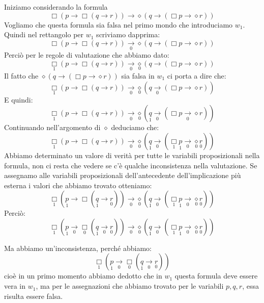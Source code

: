 \documentclass[a4paper, 12pt]{article}
\begin{document}
Iniziamo considerando la formula
$$\Box(p \rightarrow \Box(q \rightarrow r)) \rightarrow \diamond(q \rightarrow (\Box p \rightarrow \diamond r))$$
Vogliamo che questa formula sia falsa nel primo mondo che introduciamo $w_1$.
Quindi nel rettangolo per $w_1$ scriviamo dapprima:
$$\Box(p \rightarrow \Box(q \rightarrow r)) \underset{0}{\rightarrow} \diamond(q \rightarrow (\Box p \rightarrow \diamond r))$$
Perciò per le regole di valutazione che abbiamo dato:
$$\underset{1}{\Box}(p \rightarrow \Box(q \rightarrow r)) \underset{0}{\rightarrow} \underset{0}\diamond(q \rightarrow (\Box p \rightarrow \diamond r))$$
Il fatto che $\diamond(q \rightarrow (\Box p \rightarrow \diamond r))$ sia falsa in $w_1$ ci porta a dire che:
$$\underset{1}{\Box}(p \rightarrow \Box(q \rightarrow r)) \underset{0}{\rightarrow} \underset{0}\diamond(q \underset{0}{\rightarrow} (\Box p \rightarrow \diamond r))$$
E quindi:
$$\underset{1}{\Box}(p \rightarrow \Box(q \rightarrow r)) \underset{0}{\rightarrow} \underset{0}\diamond(\underset{1}{q} \underset{0}{\rightarrow} (\Box p \underset{0}{\rightarrow} \diamond r))$$
Continuando nell'argomento di $\diamond$ deduciamo che:
$$\underset{1}{\Box}(p \rightarrow \Box(q \rightarrow r)) \underset{0}{\rightarrow} \underset{0}\diamond(\underset{1}{q} \underset{0}{\rightarrow} (\underset{1}{\Box} \underset{1}{p} \underset{0}{\rightarrow} \underset{0}{\diamond} \underset{0}{r}))$$
Abbiamo determinato un valore di verità per tutte le variabili proposizionali nella formula, non ci resta che vedere se c'è qualche inconsistenza nella valutazione.
Se assegnamo alle variabili proposizionali dell'antecedente dell'implicazione più esterna i valori
che abbiamo trovato otteniamo:
$$\underset{1}{\Box}(\underset{1}{p} \rightarrow \Box(\underset{1}{q} \rightarrow \underset{0}{r})) \underset{0}{\rightarrow} \underset{0}\diamond(\underset{1}{q} \underset{0}{\rightarrow} (\underset{1}{\Box} \underset{1}{p} \underset{0}{\rightarrow} \underset{0}{\diamond} \underset{0}{r}))$$
Perciò:
$$\underset{1}{\Box}(\underset{1}{p} \underset{0}{\rightarrow} \underset{0}{\Box}(\underset{1}{q} \underset{0}{\rightarrow} \underset{0}{r})) \underset{0}{\rightarrow} \underset{0}\diamond(\underset{1}{q} \underset{0}{\rightarrow} (\underset{1}{\Box} \underset{1}{p} \underset{0}{\rightarrow} \underset{0}{\diamond} \underset{0}{r}))$$

Ma abbiamo un'inconsistenza, perché abbiamo:
$$\underset{1}{\Box}(\underset{1}{p} \underset{0}{\rightarrow}\underset{0}{\Box}(\underset{1}{q} \underset{0}{\rightarrow} \underset{0}{r}))$$
cioè in un primo momento abbiamo dedotto che in $w_1$ questa formula deve essere vera in $w_1$,
ma per le assegnazioni che abbiamo trovato per le variabili $p, q, r$, essa risulta essere falsa.
\end{document}
